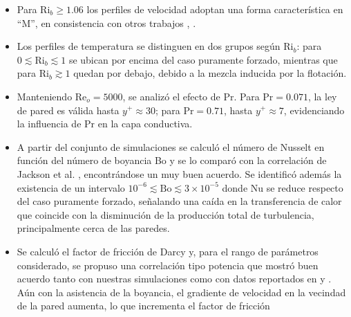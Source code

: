 \begin{itemize}

\item Para $\text{Ri}_b \geq 1\text{.}06$ los perfiles de velocidad adoptan una forma característica en ``M'', en consistencia con otros trabajos \cite{you2003direct}, \cite{zhou2024direct}.

\item Los perfiles de temperatura se distinguen en dos grupos según $\text{Ri}_b$: para $0 \lesssim \text{Ri}_b \lesssim 1$ se ubican por encima del caso puramente forzado, mientras que para $\text{Ri}_b \gtrsim 1$ quedan por debajo, debido a la mezcla inducida por la flotación.

\item Manteniendo $\text{Re}_o=5000$, se analizó el efecto de $\text{Pr}$. Para $\text{Pr}=0\text{.}071$, la ley de pared \cite{kawamura1998dns} es válida hasta $y^+ \approx 30$; para $\text{Pr}=0\text{.}71$, hasta $y^+ \approx 7$, evidenciando la influencia de $\text{Pr}$ en la capa conductiva.

\item A partir del conjunto de simulaciones se calculó el número de Nusselt en función del número de boyancia Bo y se lo comparó con la correlación de Jackson et al. \cite{jackson1989studies}, encontrándose un muy buen acuerdo. Se identificó además la existencia de un intervalo $10^{-6} \lesssim \text{Bo} \lesssim 3 \times 10^{-5}$ donde Nu se reduce respecto del caso puramente forzado, señalando una caída en la transferencia de calor que coincide con la disminución de la producción total de turbulencia, principalmente cerca de las paredes.

\item Se calculó el factor de fricción de Darcy y, para el rango de parámetros considerado, se propuso una correlación tipo potencia que mostró buen acuerdo tanto con nuestras simulaciones como con datos reportados en \cite{you2003direct} y \cite{parlatan1996buoyancy}. Aún con la asistencia de la boyancia, el gradiente de velocidad en la vecindad de la pared aumenta, lo que incrementa el factor de fricción

\end{itemize} 

